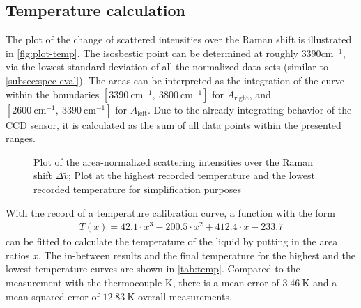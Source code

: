 \subsection{Temperature calculation}
\label{subsec:temp-eval}

The plot of the change of scattered intensities over the Raman shift is illustrated in \autoref{fig:plot-temp}. The isosbestic point can be determined at roughly $3390 \mathrm{cm^{-1}}$, via the lowest standard deviation of all the normalized data sets (similar to \autoref{subsec:spec-eval}). The areas can be interpreted as the integration of the curve within the boundaries $[3390~\mathrm{cm^{-1}},~3800~\mathrm{cm^{-1}}]$ for $A_\mathrm{right}$, and $[2600~\mathrm{cm^{-1}},~3390~\mathrm{cm^{-1}}]$ for $A_\mathrm{left}$. Due to the already integrating behavior of the CCD sensor, it is calculated as the sum of all data points within the presented ranges.

\begin{figure}[!htb]
    \centering
    
    \caption[Area-normalized Raman shift intensities for the lowest and highest temperatures]{Plot of the area-normalized scattering intensities over the Raman shift $\Delta \tilde{v}$; Plot at the highest recorded temperature and the lowest recorded temperature for simplification purposes} 
    \label{fig:plot-temp}
\end{figure}

With the record of a temperature calibration curve, a function with the form
\begin{align}
    T(x)=42.1 \cdot x^3 - 200.5 \cdot x^2 + 412.4 \cdot x -233.7
\end{align}
can be fitted to calculate the temperature of the liquid by putting in the area ratios $x$. The in-between results and the final temperature for the highest and the lowest temperature curves are shown in \autoref{tab:temp}. Compared to the measurement with the thermocouple K, there is a mean error of $3.46~\mathrm{K}$ and a mean squared error of $12.83~\mathrm{K}$ overall measurements.

